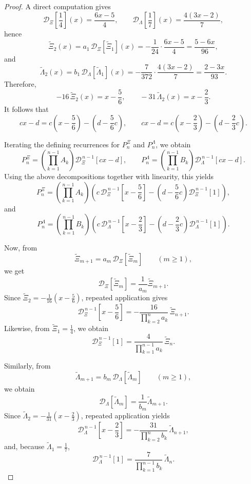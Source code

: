 \documentclass[11pt,twoside]{article}
\numberwithin{equation}{section}
\begin{document}
\begin{proof}
A direct computation gives
\[
\mathcal D_{\Xi}\!\left[\frac14\right](x)=\frac{6x-5}{4},
\qquad
\mathcal D_{\Lambda}\!\left[\frac17\right](x)=\frac{4(3x-2)}{7},
\]
hence
\[
\widetilde{\Xi}_2(x)
=
a_1\,\mathcal D_{\Xi}\!\left[\widetilde{\Xi}_1\right](x)
=
-\frac{1}{24}\cdot\frac{6x-5}{4}
=
\frac{5-6x}{96},
\]
and
\[
\widetilde{\Lambda}_2(x)
=
b_1\,\mathcal D_{\Lambda}\!\left[\widetilde{\Lambda}_1\right](x)
=
-\frac{7}{372}\cdot\frac{4(3x-2)}{7}
=
\frac{2-3x}{93}.
\]
Therefore,
\[
-16\,\widetilde{\Xi}_2(x)=x-\frac56,
\qquad
-31\,\widetilde{\Lambda}_2(x)=x-\frac23.
\]
It follows that
\[
cx-d
=
c\left(x-\frac56\right)-\left(d-\frac56c\right),
\qquad
cx-d
=
c\left(x-\frac23\right)-\left(d-\frac23c\right).
\]

Iterating the defining recurrences for \(P_n^\Xi\) and \(P_n^\Lambda\), we obtain
\[
P_n^\Xi
=
\left(\displaystyle\prod_{k=1}^{n-1}A_k\right)\mathcal D_\Xi^{\,n-1}[cx-d],
\qquad
P_n^\Lambda
=
\left(\displaystyle\prod_{k=1}^{n-1}B_k\right)\mathcal D_\Lambda^{\,n-1}[cx-d].
\]
Using the above decompositions together with linearity, this yields
\[
P_n^\Xi
=
\left(\displaystyle\prod_{k=1}^{n-1}A_k\right)
\left(
c\,\mathcal D_\Xi^{\,n-1}\!\left[x-\frac56\right]
-
\left(d-\frac56c\right)\mathcal D_\Xi^{\,n-1}[1]
\right),
\]
and
\[
P_n^\Lambda
=
\left(\displaystyle\prod_{k=1}^{n-1}B_k\right)
\left(
c\,\mathcal D_\Lambda^{\,n-1}\!\left[x-\frac23\right]
-
\left(d-\frac23c\right)\mathcal D_\Lambda^{\,n-1}[1]
\right).
\]

Now, from
\[
\widetilde{\Xi}_{m+1}=a_m\,\mathcal D_\Xi[\widetilde{\Xi}_m]
\qquad (m\ge1),
\]
we get
\[
\mathcal D_\Xi[\widetilde{\Xi}_m]=\frac{1}{a_m}\widetilde{\Xi}_{m+1}.
\]
Since \(\widetilde{\Xi}_2=-\frac1{16}\left(x-\frac56\right)\), repeated application gives
\[
\mathcal D_\Xi^{\,n-1}\!\left[x-\frac56\right]
=
-\frac{16}{\displaystyle\prod_{k=2}^{n}a_k}\,\widetilde{\Xi}_{n+1}.
\]
Likewise, from \(\widetilde{\Xi}_1=\frac14\), we obtain
\[
\mathcal D_\Xi^{\,n-1}[1]
=
\frac{4}{\displaystyle\prod_{k=1}^{n-1}a_k}\,\widetilde{\Xi}_n.
\]

Similarly, from
\[
\widetilde{\Lambda}_{m+1}=b_m\,\mathcal D_\Lambda[\widetilde{\Lambda}_m]
\qquad (m\ge1),
\]
we obtain
\[
\mathcal D_\Lambda[\widetilde{\Lambda}_m]=\frac{1}{b_m}\widetilde{\Lambda}_{m+1}.
\]
Since \(\widetilde{\Lambda}_2=-\frac1{31}\left(x-\frac23\right)\), repeated application yields
\[
\mathcal D_\Lambda^{\,n-1}\!\left[x-\frac23\right]
=
-\frac{31}{\displaystyle\prod_{k=2}^{n}b_k}\,\widetilde{\Lambda}_{n+1},
\]
and, because \(\widetilde{\Lambda}_1=\frac17\),
\[
\mathcal D_\Lambda^{\,n-1}[1]
=
\frac{7}{\displaystyle\prod_{k=1}^{n-1}b_k}\,\widetilde{\Lambda}_n.
\]


\end{proof}
\end{document}
